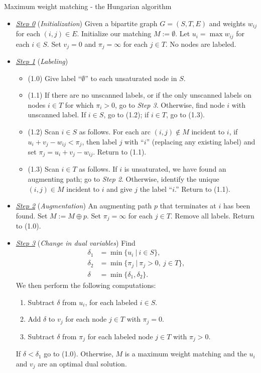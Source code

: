 \documentclass[11pt]{article}
\renewcommand{\'}{^{'}}
\begin{document}
\begin{section}{Maximum weight matching - the Hungarian algorithm}
\begin{itemize}
	\item \underline{\emph{Step 0}} (\emph{Initialization}) Given a bipartite graph 
		$G = (S,T,E)$ and weights $w_{ij}$ for each $(i,j)\in E$. Initialize our 
		matching $M := \emptyset$. Let $u_i = \max {w_{ij}}$ for each $i\in S$. 
		Set $v_j = 0$ and $\pi_j = \infty$ for each $j\in T$. No nodes are labeled.
	\item \underline{\emph{Step 1}} (\emph{Labeling}) 
		\begin{itemize}
			\item (1.0) Give label ``$\emptyset$'' to each unsaturated node 
				in $S$.
			\item (1.1) If there are no unscanned labels, or if the only 
				unscanned labels on nodes $i\in T$ for which $\pi_i > 0$, go 
				to \emph{Step 3}. Otherwise, find node $i$ with unscanned 
				label. If $i\in S$, go to (1.2); if $i\in T$, go to (1.3).
			\item (1.2) Scan $i\in S$ as follows. For each arc $(i,j)\notin M$ 
				incident to $i$, if $u_i + v_j - w_{ij} < \pi_j$, then 
				label $j$ with ``$i$'' (replacing any existing label) and 
				set $\pi_j = u_i + v_j -w_{ij}$. Return to (1.1).
			\item (1.3) Scan $i\in T$ as follows. If $i$ is unsaturated, we have 
				found an augmenting path; go to \emph{Step 2}. Otherwise, 
				identify the unique $(i,j)\in M$ incident to $i$ and give 
				$j$ the label ``$i$.'' Return to (1.1).
		\end{itemize}
	\item \underline{\emph{Step 2}} (\emph{Augmentation}) An augmenting path $p$ that 
		terminates at $i$ has been found. Set $M := M\oplus p$. Set $\pi_j = \infty$ 
		for each $j\in T$. Remove all labels. Return to (1.0).
	\item \underline{\emph{Step 3}} (\emph{Change in dual variables}) Find
		\begin{align*}
			\delta_1 &= \min \{u_i\ |\ i\in S\},\\
			\delta_2 &= \min \{\pi_j\ |\ \pi_j > 0,\ j\in T\},\\
			\delta &= \min \{\delta_1, \delta_2\}.
		\end{align*}
		We then perform the following computations:
		\begin{enumerate}
			\item Subtract $\delta$ from $u_i$, for each labeled $i\in S$. 
			\item Add $\delta$ to $v_j$ for each node $j\in T$ with $\pi_j = 0$. 
			\item Subtract $\delta$ from $\pi_j$ for each labeled node $j\in T$ 
				with $\pi_j > 0$.
		\end{enumerate}
		If $\delta < \delta_1$ go to (1.0). 
		Otherwise, $M$ is a maximum weight matching and the $u_i$ and $v_j$ are an 
		optimal dual solution.
\end{itemize}


\end{section}
\end{document}
